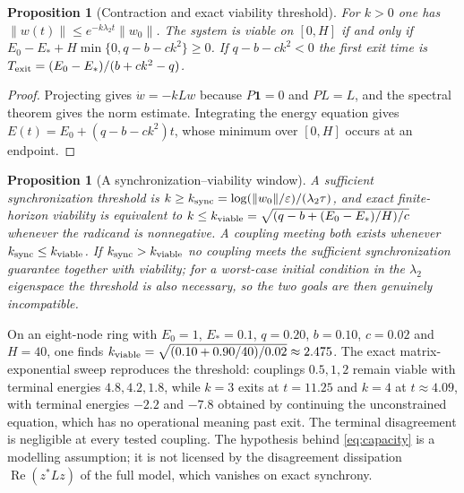 \documentclass[11pt,notitlepage]{report}
\newtheorem{proposition}[theorem]{Proposition}
\theoremstyle{definition}
\theoremstyle{remark}
\newcommand{\re}{\operatorname{Re}}
\newcommand{\one}{\mathbf 1}
\begin{document}
\begin{proposition}[Contraction and exact viability threshold]\label{prop:capacity}
For $k>0$ one has $\|w(t)\|\le e^{-k\lambda_2t}\|w_0\|$. The system is viable on $[0,H]$ if and only if $E_0-E_*+H\min\{0,q-b-ck^2\}\ge0$. If $q-b-ck^2<0$ the first exit time is $T_{\rm exit}=(E_0-E_*)/(b+ck^2-q)$.
\end{proposition}
\begin{proof}
Projecting gives $\dot w=-kLw$ because $P\one=0$ and $PL=L$, and the spectral theorem gives the norm estimate. Integrating the energy equation gives $E(t)=E_0+(q-b-ck^2)t$, whose minimum over $[0,H]$ occurs at an endpoint.
\end{proof}
\begin{proposition}[A synchronization--viability window]\label{prop:window}
A sufficient synchronization threshold is $k\ge k_{\rm sync}=\log(\|w_0\|/\varepsilon)/(\lambda_2\tau)$, and exact finite-horizon viability is equivalent to $k\le k_{\rm viable}=\sqrt{(q-b+(E_0-E_*)/H)/c}$ whenever the radicand is nonnegative. A coupling meeting both exists whenever $k_{\rm sync}\le k_{\rm viable}$. If $k_{\rm sync}>k_{\rm viable}$ no coupling meets the sufficient synchronization guarantee together with viability; for a worst-case initial condition in the $\lambda_2$ eigenspace the threshold is also necessary, so the two goals are then genuinely incompatible.
\end{proposition}
On an eight-node ring with $E_0=1$, $E_*=0.1$, $q=0.20$, $b=0.10$, $c=0.02$ and $H=40$, one finds $k_{\rm viable}=\sqrt{(0.10+0.90/40)/0.02}\approx2.475$. The exact matrix-exponential sweep reproduces the threshold: couplings $0.5,1,2$ remain viable with terminal energies $4.8,4.2,1.8$, while $k=3$ exits at $t=11.25$ and $k=4$ at $t\approx4.09$, with terminal energies $-2.2$ and $-7.8$ obtained by continuing the unconstrained equation, which has no operational meaning past exit. The terminal disagreement is negligible at every tested coupling. The hypothesis behind \eqref{eq:capacity} is a modelling assumption; it is not licensed by the disagreement dissipation $\re(z^*Lz)$ of the full model, which vanishes on exact synchrony.
\end{document}
